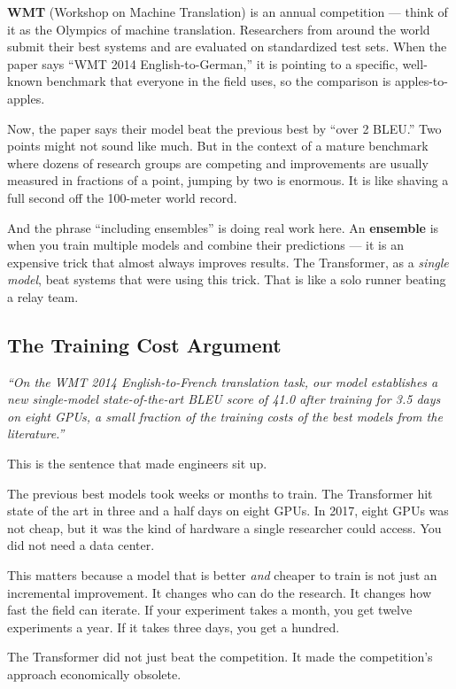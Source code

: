 \textbf{WMT} (Workshop on Machine Translation) is an annual competition --- think of it as the Olympics of machine translation.
Researchers from around the world submit their best systems and are evaluated on standardized test sets.
When the paper says ``WMT 2014 English-to-German,'' it is pointing to a specific, well-known benchmark that everyone in the field uses, so the comparison is apples-to-apples.

Now, the paper says their model beat the previous best by ``over 2 BLEU.''
Two points might not sound like much.
But in the context of a mature benchmark where dozens of research groups are competing and improvements are usually measured in fractions of a point, jumping by two is enormous.
It is like shaving a full second off the 100-meter world record.

And the phrase ``including ensembles'' is doing real work here.
An \textbf{ensemble} is when you train multiple models and combine their predictions --- it is an expensive trick that almost always improves results.
The Transformer, as a \emph{single model}, beat systems that were using this trick.
That is like a solo runner beating a relay team.

\subsection{The Training Cost Argument}

\emph{``On the WMT 2014 English-to-French translation task, our model establishes a new single-model state-of-the-art BLEU score of 41.0 after training for 3.5 days on eight GPUs, a small fraction of the training costs of the best models from the literature.''}

This is the sentence that made engineers sit up.

The previous best models took weeks or months to train.
The Transformer hit state of the art in three and a half days on eight GPUs.
In 2017, eight GPUs was not cheap, but it was the kind of hardware a single researcher could access.
You did not need a data center.

This matters because a model that is better \emph{and} cheaper to train is not just an incremental improvement.
It changes who can do the research.
It changes how fast the field can iterate.
If your experiment takes a month, you get twelve experiments a year.
If it takes three days, you get a hundred.

The Transformer did not just beat the competition.
It made the competition's approach economically obsolete.
